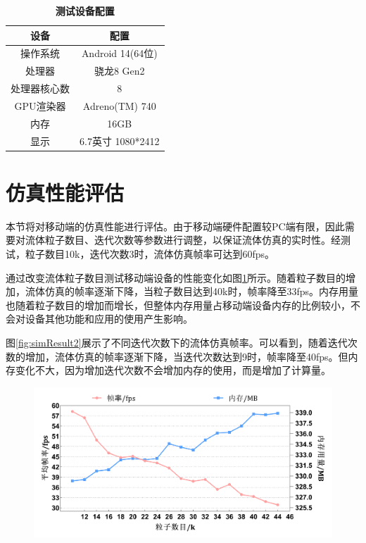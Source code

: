 \begin{table}[H]
    \caption{\textbf{测试设备配置}}
    \label{tab:device}
    \centering
    \begin{tabular}{cc}
        \toprule
        设备 & 配置 \\
        \midrule
        操作系统 & Android 14(64位) \\
        处理器 & 骁龙8 Gen2 \\
        处理器核心数 & 8 \\
        GPU渲染器 & Adreno(TM) 740 \\
        内存 & 16GB \\
        显示 & 6.7英寸 1080*2412 \\
        \bottomrule
    \end{tabular}
\end{table}


\section{仿真性能评估}

本节将对移动端的仿真性能进行评估。由于移动端硬件配置较PC端有限，因此需要对流体粒子数目、迭代次数等参数进行调整，以保证流体仿真的实时性。经测试，粒子数目10k，迭代次数3时，流体仿真帧率可达到60fps。

通过改变流体粒子数目测试移动端设备的性能变化如图\ref{fig:simResult}所示。随着粒子数目的增加，流体仿真的帧率逐渐下降，当粒子数目达到40k时，帧率降至33fps。内存用量也随着粒子数目的增加而增长，但整体内存用量占移动端设备内存的比例较小，不会对设备其他功能和应用的使用产生影响。

图\ref{fig:simResult2}展示了不同迭代次数下的流体仿真帧率。可以看到，随着迭代次数的增加，流体仿真的帧率逐渐下降，当迭代次数达到9时，帧率降至40fps。但内存变化不大，因为增加迭代次数不会增加内存的使用，而是增加了计算量。


\begin{figure}[H]
    \centering
    \includegraphics[width=12cm]{image/particleNums.png}
    \label{fig:simResult}
\end{figure}

